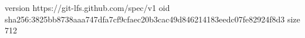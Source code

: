 version https://git-lfs.github.com/spec/v1
oid sha256:3825bb8738aaa747dfa7cf9cfaec20b3cac49d846214183eedc07fe82924f8d3
size 712
